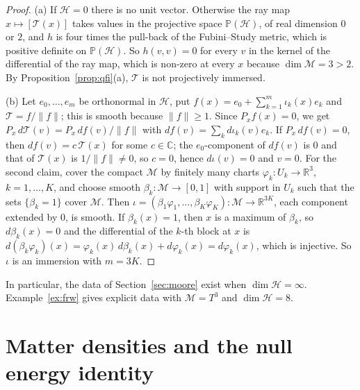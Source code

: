\documentclass[11pt,a4paper,reqno]{amsart}
\theoremstyle{definition}
\numberwithin{equation}{section}
\newcommand{\R}{\mathbb{R}}
\newcommand{\C}{\mathbb{C}}
\begin{document}
\begin{proof}
(a) If $\mathcal{H}=0$ there is no unit vector. Otherwise the ray map $x\mapsto[\mathcal{T}(x)]$ takes values in the projective space $\mathbb{P}(\mathcal{H})$, of real dimension $0$ or $2$, and $h$ is four times the pull-back of the Fubini--Study metric, which is positive definite on $\mathbb{P}(\mathcal{H})$. So $h(v,v)=0$ for every $v$ in the kernel of the differential of the ray map, which is non-zero at every $x$ because $\dim\mathcal{M}=3>2$. By Proposition~\ref{prop:qfi}(a), $\mathcal{T}$ is not projectively immersed.

(b) Let $e_0,\dots,e_m$ be orthonormal in $\mathcal{H}$, put $f(x)=e_0+\sum_{k=1}^m\iota_k(x)e_k$ and $\mathcal{T}=f/\|f\|$; this is smooth because $\|f\|\ge1$. Since $P_xf(x)=0$, we get $P_x\,d\mathcal{T}(v)=P_x\,df(v)/\|f\|$ with $df(v)=\sum_k d\iota_k(v)e_k$. If $P_x\,df(v)=0$, then $df(v)=c\,\mathcal{T}(x)$ for some $c\in\C$; the $e_0$-component of $df(v)$ is $0$ and that of $\mathcal{T}(x)$ is $1/\|f\|\neq0$, so $c=0$, hence $d\iota(v)=0$ and $v=0$. For the second claim, cover the compact $\mathcal{M}$ by finitely many charts $\varphi_k:U_k\to\R^3$, $k=1,\dots,K$, and choose smooth $\beta_k:\mathcal{M}\to[0,1]$ with support in $U_k$ such that the sets $\{\beta_k=1\}$ cover $\mathcal{M}$. Then $\iota=(\beta_1\varphi_1,\dots,\beta_K\varphi_K):\mathcal{M}\to\R^{3K}$, each component extended by $0$, is smooth. If $\beta_k(x)=1$, then $x$ is a maximum of $\beta_k$, so $d\beta_k(x)=0$ and the differential of the $k$-th block at $x$ is $d(\beta_k\varphi_k)(x)=\varphi_k(x)\,d\beta_k(x)+d\varphi_k(x)=d\varphi_k(x)$, which is injective. So $\iota$ is an immersion with $m=3K$.
\end{proof}

In particular, the data of Section~\ref{sec:moore} exist when $\dim\mathcal{H}=\infty$. Example~\ref{ex:frw} gives explicit data with $\mathcal{M}=T^3$ and $\dim\mathcal{H}=8$.

\section{Matter densities and the null energy identity}
\label{sec:matter}
\end{document}
